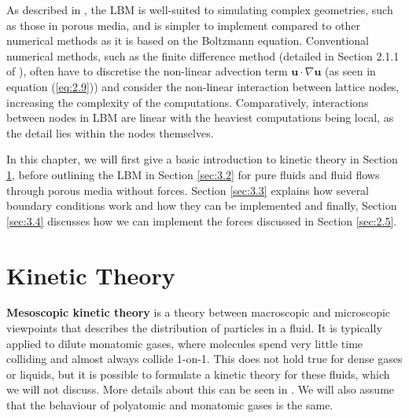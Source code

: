 \documentclass[a4paper, 11pt]{report}
\begin{document}



As described in \cite[Chapter~3]{lbtextbook}, the LBM is well-suited to simulating complex geometries, such as those in porous media, and is simpler to implement compared to other numerical methods as it is based on the Boltzmann equation. Conventional numerical methods, such as the finite difference method (detailed in Section 2.1.1 of \cite{lbtextbook}), often have to discretise the non-linear advection term $\mathbf{u}\cdot\nabla\mathbf{u}$ (as seen in equation (\ref{eq:2.9})) and consider the non-linear interaction between lattice nodes, increasing the complexity of the computations. Comparatively, interactions between nodes in LBM are linear with the heaviest computations being local, as the detail lies within the nodes themselves. 

In this chapter, we will first give a basic introduction to kinetic theory in Section \ref{sec:3.1}, before outlining the LBM in Section \ref{sec:3.2} for pure fluids and fluid flows through porous media without forces. Section \ref{sec:3.3} explains how several boundary conditions work and how they can be implemented and finally, Section \ref{sec:3.4} discusses how we can implement the forces discussed in Section \ref{sec:2.5}.

\section{Kinetic Theory} \label{sec:3.1}
\textbf{Mesoscopic kinetic theory} is a theory between macroscopic and microscopic viewpoints that describes the distribution of particles in a fluid. It is typically applied to dilute monatomic gases, where molecules spend very little time colliding and almost always collide 1-on-1. This does not hold true for dense gases or liquids, but it is possible to formulate a kinetic theory for these fluids, which we will not discuss. More details about this can be seen in \cite{liquidkin}. We will also assume that the behaviour of polyatomic and monatomic gases is the same.
\end{document}
